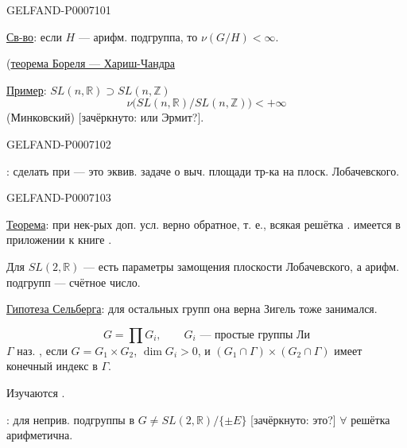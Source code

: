 \begin{GelfandAdjacentEvidence}{GELFAND-P000710}{1}

\underline{\underline{Св-во}}: если \(H\) --- арифм. подгруппа, то \(\nu(G/H)<\infty\).

(\href{https://www.mathnet.ru/eng/mat302}{теорема Бореля — Хариш-Чандра}

\underline{Пример}: \(SL(n,\mathbb R)\supset SL(n,\mathbb Z)\)
\[
\nu\bigl(SL(n,\mathbb R)/SL(n,\mathbb Z)\bigr)<+\infty
\]
(Минковский) [зачёркнуто: или Эрмит?].
\end{GelfandAdjacentEvidence}
\begin{GelfandAdjacentEvidence}{GELFAND-P000710}{2}


: сделать при  --- это эквив. задаче о выч. площади тр-ка на плоск. Лобачевского.
\end{GelfandAdjacentEvidence}
\begin{GelfandAdjacentEvidence}{GELFAND-P000710}{3}


\underline{Теорема}: при нек-рых доп. усл. верно обратное, т. е.,
всякая решётка .
 имеется в приложении к книге .

Для \(SL(2,\mathbb R)\)  --- есть параметры замощения плоскости Лобачевского, а арифм. подгрупп --- счётное число.

\underline{Гипотеза Сельберга}: для остальных групп она верна
Зигель тоже занимался.

\[
G=\prod G_i,\qquad G_i\text{ --- простые группы Ли}
\]
 \(\Gamma\) наз. , если
\(G=G_1\times G_2\), \(\dim G_i>0\),
и \((G_1\cap\Gamma)\times(G_2\cap\Gamma)\) имеет конечный индекс в \(\Gamma\).

Изучаются .

: для неприв. подгруппы в \(G\ne SL(2,\mathbb R)/\{\pm E\}\)
[зачёркнуто: это?] \(\forall\) решётка арифметична.
\end{GelfandAdjacentEvidence}
